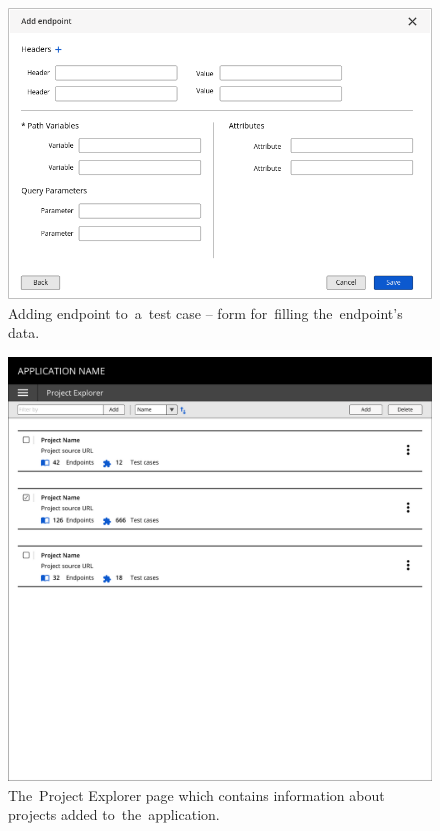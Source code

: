 \begin{figure}[!hbt]
	\centering
	\includegraphics[scale=0.6]{./designs/addTest2.png}
	\caption{Adding endpoint to~a~test case -- form for~filling the~endpoint's
	data.}
	\label{figAddTest2}
\end{figure}


\begin{figure}[!hbt]
	\centering
	\includegraphics[scale=0.57]{./designs/projectExplorer.pdf}
	\caption{The~Project Explorer page which contains information about projects
	added to~the~application.}
	\label{figExplorerView}
\end{figure}

